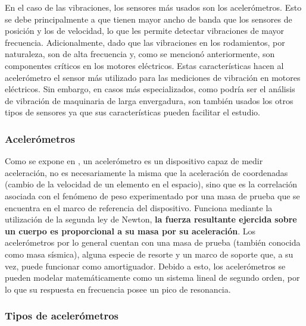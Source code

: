 En el caso de las vibraciones, los sensores más usados son los
acelerómetros.  Esto se debe principalmente a que tienen mayor ancho de banda
que los sensores de posición y los de velocidad, lo que les permite detectar
vibraciones de mayor frecuencia. Adicionalmente, dado que las vibraciones en los
rodamientos, por naturaleza, son de alta frecuencia y, como se mencionó anteriormente,
son componentes críticos en los motores eléctricos.
Estas características hacen al acelerómetro el sensor más utilizado para las
mediciones de vibración en motores eléctricos. Sin embargo,
en casos más especializados, como podría ser el análisis de vibración
de maquinaria de larga envergadura, son también usados los otros tipos de
sensores ya que sus características pueden facilitar el estudio.


\subsubsection{Acelerómetros}

Como se expone en \textcite{Fraden}, un acelerómetro es un dispositivo capaz de
medir aceleración, no es
necesariamente la misma que la aceleración de coordenadas (cambio de la velocidad de
un elemento en el espacio), sino que es la correlación asociada con el fenómeno
de peso experimentado por una masa de prueba que se
encuentra en el marco de referencia del dispositivo.  Funciona mediante
la utilización de la segunda ley de Newton, \textbf{la fuerza resultante
ejercida sobre un cuerpo es proporcional a su masa por su aceleración}. Los
acelerómetros por lo general cuentan con una masa de prueba (también conocida
como masa sísmica), alguna especie de resorte y un marco de soporte que, a su
vez, puede funcionar como amortiguador. Debido a esto, los acelerómetros se
pueden modelar matemáticamente como un sistema lineal de segundo orden,
por lo que su respuesta en frecuencia posee un pico de resonancia.


\subsubsection*{Tipos de acelerómetros}

